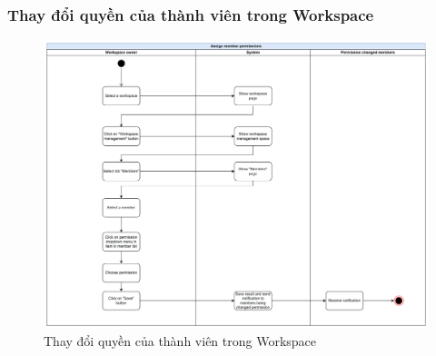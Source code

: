 \subsubsection{Thay đổi quyền của thành viên trong Workspace}
    \begin{figure}[H]
        \centering
        \includegraphics[width=\linewidth]{Content/Phân tích và thiết kế hệ thống/documents/Sơ đồ hoạt động/images/adjustMemberPermissions.png}
        \vspace{0.5cm}
        \caption{Thay đổi quyền của thành viên trong Workspace}
        \label{fig:Thay đổi quyền của thành viên trong Workspace}
    \end{figure}